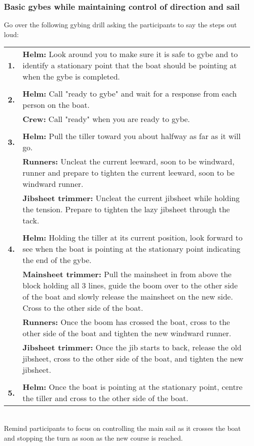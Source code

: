\documentclass[12pt]{scrartcl}
\begin{document}
\subsubsection{Basic gybes while maintaining control of direction and sail} \label{subsubsec:basic gybe}

Go over the following gybing drill asking the participants to say the steps out loud:

\label{tab:gybing drill}
\begin{tabularx}{420pt}{lX}
	\centering
	\textbf{1.} & \textbf{Helm:} Look around you to make sure it is safe to gybe and to identify a stationary point that the boat should be pointing at when the gybe is completed. \\
	& \\
	\textbf{2.} & \textbf{Helm:} Call "ready to gybe" and wait for a response from each person on the boat. \\
	& \textbf{Crew:} Call "ready" when you are ready to gybe. \\
	& \\
	\textbf{3.} & \textbf{Helm:} Pull the tiller toward you about halfway as far as it will go. \\
	& \textbf{Runners:} Uncleat the current leeward, soon to be windward, runner and prepare to tighten the current leeward, soon to be windward runner. \\
	& \textbf{Jibsheet trimmer:} Uncleat the current jibsheet while holding the tension. Prepare to tighten the lazy jibsheet through the tack. \\
	& \\
	\textbf{4.} & \textbf{Helm:} Holding the tiller at its current position, look forward to see when the boat is pointing at the stationary point indicating the end of the gybe. \\
	& \textbf{Mainsheet trimmer:} Pull the mainsheet in from above the block holding all 3 lines, guide the boom over to the other side of the boat and slowly release the mainsheet on the new side. Cross to the other side of the boat. \\
	& \textbf{Runners:} Once the boom has crossed the boat, cross to the other side of the boat and tighten the new windward runner. \\
	& \textbf{Jibsheet trimmer:} Once the jib starts to back, release the old jibsheet, cross to the other side of the boat, and tighten the new jibsheet. \\
	& \\
	\textbf{5.} & \textbf{Helm:} Once the boat is pointing at the stationary point, centre the tiller and cross to the other side of the boat. \\
\end{tabularx}
\\
Remind participants to focus on controlling the main sail as it crosses the boat and stopping the turn as soon as the new course is reached.
\end{document}
